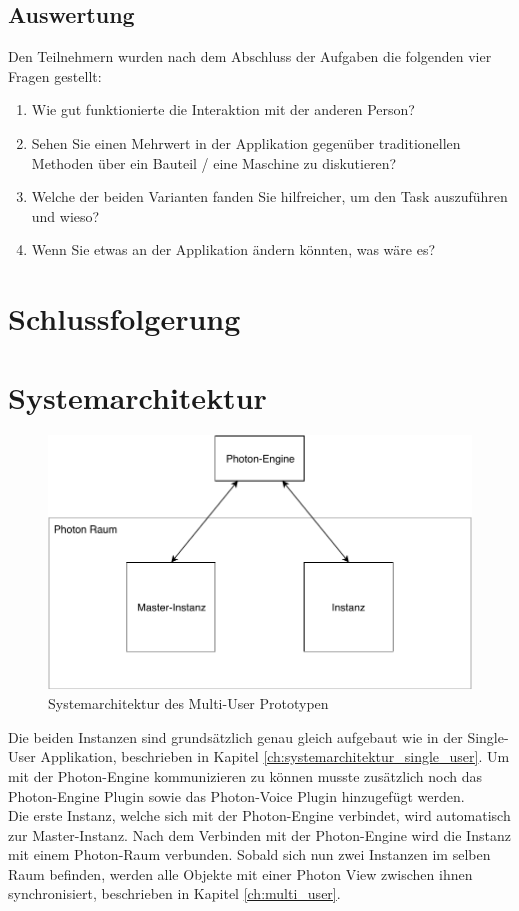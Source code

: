 \subsection{Auswertung}
Den Teilnehmern wurden nach dem Abschluss der Aufgaben die folgenden vier Fragen gestellt:

\begin{enumerate} [itemsep=1pt,topsep=0pt]
	\item Wie gut funktionierte die Interaktion mit der anderen Person?
	
	\item Sehen Sie einen Mehrwert in der Applikation gegenüber traditionellen Methoden über ein Bauteil / eine Maschine zu diskutieren?
	
	\item Welche der beiden Varianten fanden Sie hilfreicher, um den Task auszuführen und wieso?
	
	\item Wenn Sie etwas an der Applikation ändern könnten, was wäre es?
\end{enumerate}

\section{Schlussfolgerung}

\section{Systemarchitektur}
\begin{figure}[h!]
	\centering
	\includegraphics[keepaspectratio,width=0.75\linewidth]{img/ArchitekturT2.pdf}
	\caption{Systemarchitektur des Multi-User Prototypen}
	\label{fig:systemarchitektur_mutli_user}
\end{figure}

Die beiden Instanzen sind grundsätzlich genau gleich aufgebaut wie in der Single-User Applikation, beschrieben in Kapitel \ref{ch:systemarchitektur_single_user}. Um mit der Photon-Engine kommunizieren zu können musste zusätzlich noch das Photon-Engine Plugin sowie das Photon-Voice Plugin hinzugefügt werden. \\
Die erste Instanz, welche sich mit der Photon-Engine verbindet, wird automatisch zur Master-Instanz. Nach dem Verbinden mit der Photon-Engine wird die Instanz mit einem Photon-Raum verbunden. Sobald sich nun zwei Instanzen im selben Raum befinden, werden alle Objekte mit einer Photon View zwischen ihnen synchronisiert, beschrieben in Kapitel \ref{ch:multi_user}.

